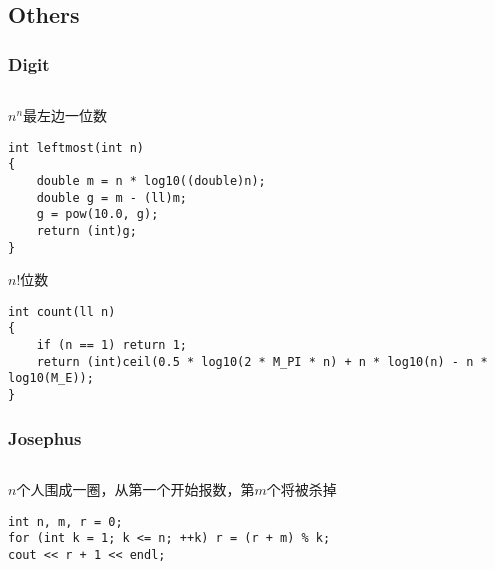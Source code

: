\documentclass[twoside]{article}
\begin{document}
\subsection{Others}
\subsubsection{Digit}
\begin{lstlisting}
\end{lstlisting}
$n^n$最左边一位数
\begin{lstlisting}
int leftmost(int n)
{
    double m = n * log10((double)n);
    double g = m - (ll)m;
    g = pow(10.0, g);
    return (int)g;
}
\end{lstlisting}
$n!$位数
\begin{lstlisting}
int count(ll n)
{
    if (n == 1) return 1;
    return (int)ceil(0.5 * log10(2 * M_PI * n) + n * log10(n) - n * log10(M_E));
}
\end{lstlisting}
\subsubsection{Josephus}
\begin{lstlisting}
\end{lstlisting}
$n$个人围成一圈，从第一个开始报数，第$m$个将被杀掉
\begin{lstlisting}
int n, m, r = 0;
for (int k = 1; k <= n; ++k) r = (r + m) % k;
cout << r + 1 << endl;
\end{lstlisting}
\end{document}
